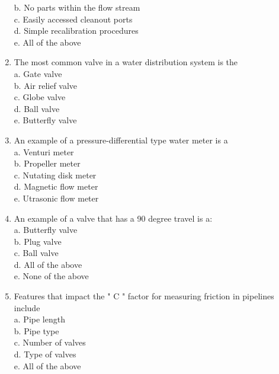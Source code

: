 \begin{enumerate}[1.]
b. No parts within the flow stream\\
c. Easily accessed cleanout ports\\
d. Simple recalibration procedures\\
e. All of the above\\
\item The most common valve in a water distribution system is the\\
a. Gate valve\\
b. Air relief valve\\
c. Globe valve\\
d. Ball valve\\
e. Butterfly valve\\
\item An example of a pressure-differential type water meter is a\\
a. Venturi meter\\
b. Propeller meter\\
c. Nutating disk meter\\
d. Magnetic flow meter\\
e. Utrasonic flow meter\\
\item An example of a valve that has a 90 degree travel is a:\\
a. Butterfly valve\\
b. Plug valve\\
c. Ball valve\\
d. All of the above\\
e. None of the above\\
\item Features that impact the " $\mathrm{C}$ " factor for measuring friction in pipelines include\\
a. Pipe length\\
b. Pipe type\\
c. Number of valves\\
d. Type of valves\\
e. All of the above 


\end{enumerate}
